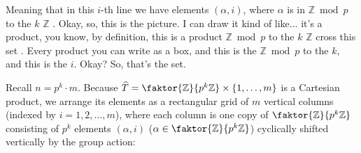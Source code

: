 \begin{proofWrapper}
\begin{speech}[01:01:58 - 01:03:08]
Meaning that in this $i$-th line we have elements $(\alpha, i)$, where $\alpha$ is in $\mathbb{Z} \bmod p$ to the $k$ $\mathbb{Z}$ . Okay, so, this is the picture. I can draw it kind of like... it's a product, you know, by definition, this is a product $\mathbb{Z} \bmod p$ to the $k$ $\mathbb{Z}$ cross this set . Every product you can write as a box, and this is the $\mathbb{Z} \bmod p$ to the $k$, and this is the $i$. Okay? So, that's the set.
\end{speech}

\begin{content}
Recall $n = p^k \cdot m$. Because $\widehat{T} = \faktor{\mathbb{Z}}{p^k\mathbb{Z}} \times \{1, \dots, m\}$ is a Cartesian product, we arrange its elements as a rectangular grid of $m$ vertical columns (indexed by $i = 1, 2, \dots, m$), where each column is one copy of $\faktor{\mathbb{Z}}{p^k\mathbb{Z}}$ consisting of $p^k$ elements $(\alpha, i)$ ($\alpha \in \faktor{\mathbb{Z}}{p^k\mathbb{Z}}$) cyclically shifted vertically by the group action:


\end{content}
\end{proofWrapper}
